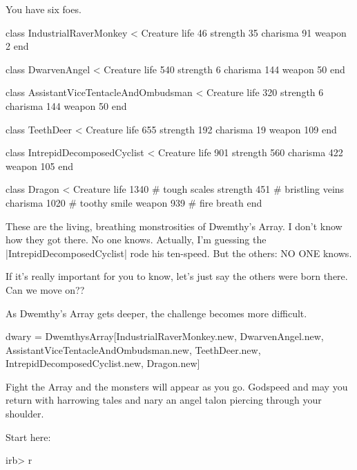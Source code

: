 \documentclass[12pt,twoside]{report}
\begin{document}
You have six foes.


\begin{rubycode}

 class IndustrialRaverMonkey < Creature
   life 46
   strength 35
   charisma 91
   weapon 2
 end

 class DwarvenAngel < Creature
   life 540
   strength 6
   charisma 144
   weapon 50
 end

 class AssistantViceTentacleAndOmbudsman < Creature
   life 320
   strength 6
   charisma 144
   weapon 50
 end

 class TeethDeer < Creature
   life 655
   strength 192
   charisma 19
   weapon 109
 end

 class IntrepidDecomposedCyclist < Creature
   life 901
   strength 560
   charisma 422
   weapon 105
 end

 class Dragon < Creature
   life 1340     # tough scales
   strength 451  # bristling veins
   charisma 1020 # toothy smile
   weapon 939    # fire breath
 end

\end{rubycode}


These are the living, breathing monstrosities of Dwemthy's Array.  I
don't know how they got there.  No one knows.  Actually, I'm guessing
the \rubyinline|IntrepidDecomposedCyclist| rode his
ten-speed.  But the others: NO ONE knows.

If it's really important for you to know, let's just say the others
were born there. Can we move on??

As Dwemthy's Array gets deeper, the challenge becomes more difficult.


\begin{rubycode}

 dwary = DwemthysArray[IndustrialRaverMonkey.new,
                       DwarvenAngel.new,
                       AssistantViceTentacleAndOmbudsman.new,
                       TeethDeer.new,
                       IntrepidDecomposedCyclist.new,
                       Dragon.new]

\end{rubycode}


Fight the Array and the monsters will appear as you go.  Godspeed and
may you return with harrowing tales and nary an angel talon piercing
through your shoulder.

Start here:


\begin{consolecode}

 irb> r %

\end{consolecode}
\end{document}
